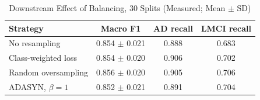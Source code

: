 \begin{table}[t]
\centering
\caption{Downstream Effect of Balancing, 30 Splits (Measured; Mean $\pm$ SD)}
\label{tab:adasyn}
\footnotesize
\begin{tabular}{@{}lccc@{}}
\toprule
Strategy & Macro F1 & AD recall & LMCI recall \\
\midrule
No resampling & 0.854 $\pm$ 0.021 & 0.888 & 0.683 \\
Class-weighted loss & 0.854 $\pm$ 0.020 & 0.906 & 0.702 \\
Random oversampling & 0.856 $\pm$ 0.020 & 0.905 & 0.706 \\
ADASYN, $\beta=1$ & 0.852 $\pm$ 0.021 & 0.891 & 0.704 \\
\bottomrule
\end{tabular}
\end{table}
